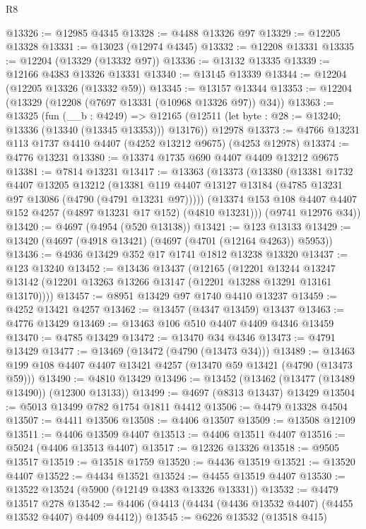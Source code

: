 \begin{lexlean}{R8}
\begin{coremodule}
@13326 := @12985 @4345
@13328 := @4488 @13326 @97
@13329 := @12205 @13328
@13331 := @13023 (@12974 @4345)
@13332 := @12208 @13331
@13335 := @12204 (@13329 (@13332 @97))
@13336 := @13132 @13335
@13339 := @12166 @4383 @13326 @13331
@13340 := @13145 @13339
@13344 := @12204 (@12205 @13326 (@13332 @59))
@13345 := @13157 @13344
@13353 := @12204 (@13329 (@12208 (@7697 @13331 (@10968 @13326 @97)) @34))
@13363 := @13325
    (fun (__b : @4249) =>
    @12165 (@12511 (let byte : @28 := @13240; @13336 (@13340 (@13345 @13353))) @13176))
    @12978
@13373 := @4766 @13231 @113 @1737 @4410 @4407 (@4252 @13212 @9675) (@4253 @12978)
@13374 := @4776 @13231
@13380 := @13374 @1735 @690 @4407 @4409 @13212 @9675
@13381 := @7814 @13231
@13417 := @13363
    (@13373
      (@13380
        (@13381
          @1732
          @4407
          @13205
          @13212
          (@13381 @119 @4407 @13127 @13184 (@4785 @13231 @97 @13086 (@4790 (@4791 @13231 @97)))))
        (@13374 @153 @108 @4407 @4407 @152 @4257 (@4897 @13231 @17 @152) (@4810 @13231)))
      (@9741 @12976 @34))
@13420 := @4697 (@4954 (@520 @13138))
@13421 := @123 @13133
@13429 := @13420 (@4697 (@4918 @13421) (@4697 (@4701 (@12164 @4263)) @5953))
@13436 := @4936 @13429 @352 @17 @1741 @1812 @13238 @13320
@13437 := @123 @13240
@13452 := @13436
    @13437
    (@12165
      (@12201
        @13244
        @13247
        @13142
        (@12201 @13263 @13266 @13147 (@12201 @13288 @13291 @13161 @13170))))
@13457 := @8951 @13429 @97 @1740 @4410 @13237
@13459 := @4252 @13421 @4257
@13462 := @13457 (@4347 @13459) @13437
@13463 := @4776 @13429
@13469 := @13463 @106 @510 @4407 @4409 @4346 @13459
@13470 := @4785 @13429
@13472 := @13470 @34 @4346
@13473 := @4791 @13429
@13477 := @13469 (@13472 (@4790 (@13473 @34)))
@13489 := @13463 @199 @108 @4407 @4407 @13421 @4257 (@13470 @59 @13421 (@4790 (@13473 @59)))
@13490 := @4810 @13429
@13496 := @13452 (@13462 (@13477 (@13489 @13490)) (@12300 @13133))
@13499 := @4697 (@8313 @13437) @13429
@13504 := @5013 @13499 @782 @1754 @1811 @4412
@13506 := @4479 @13328 @4504
@13507 := @4411 @13506
@13508 := @4406 @13507
@13509 := @13508 @12109
@13511 := @4406 @13509 @4407
@13513 := @4406 @13511 @4407
@13516 := @5024 (@4406 @13513 @4407)
@13517 := @12326 @13326
@13518 := @9505 @13517
@13519 := @13518 @1759
@13520 := @4436 @13519
@13521 := @13520 @4407
@13522 := @4434 @13521
@13524 := @4455 @13519 @4407
@13530 := @13522 @13524 (@5900 (@12149 @4383 @13326 @13331))
@13532 := @4479 @13517 @278
@13542 := @4406 (@4413 (@4434 (@4436 @13532 @4407) (@4455 @13532 @4407) @4409 @4412))
@13545 := @6226 @13532 (@13518 @415)

\end{coremodule}
\end{lexlean}
